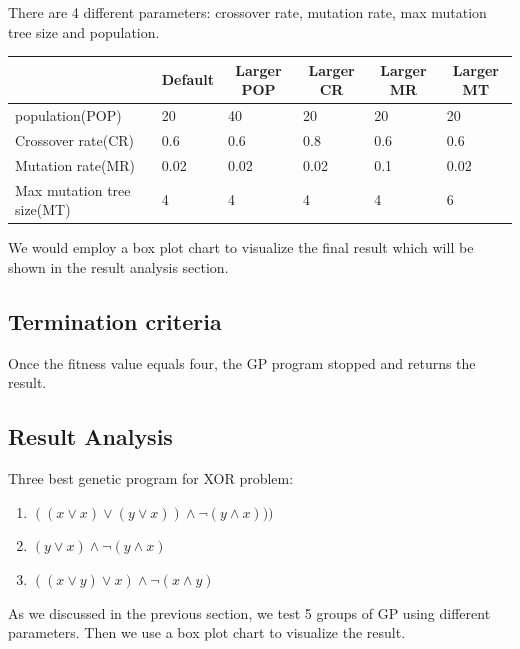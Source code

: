 \documentclass[11pt, a4paper, oneside, openright]{article}
\begin{document}
There  are 4 different parameters: crossover rate, mutation rate, max mutation tree size and population.
\begin{table}[H]
\centering
\begin{tabular}{|l|l|l|l|l|l|}
\hline
\multicolumn{1}{|c|}{\textbf{}} & \multicolumn{1}{c|}{\textbf{Default}} & \multicolumn{1}{c|}{\textbf{Larger POP}} &\multicolumn{1}{c|}{\textbf{Larger CR}} &\multicolumn{1}{c|}{\textbf{Larger MR}} &\multicolumn{1}{c|}{\textbf{Larger MT}}\\
\hline
population(POP)    &20     &40        &20    &20 &20                    \\
\hline
Crossover rate(CR)    &0.6  &0.6   &0.8   &0.6 &0.6                   \\
\hline
Mutation rate(MR)  &0.02  &0.02  &0.02  &0.1 &0.02              \\
\hline
Max mutation tree size(MT)    &4  &4 &4  &4 &6                     \\
\hline
\end{tabular}
\end{table}
We would employ a box plot chart to visualize the final result which will be shown in the result analysis section.

\subsection{Termination criteria}
Once the fitness value equals four, the GP program stopped and returns the result. 
\subsection{Result Analysis}
Three best genetic program for XOR problem:
\begin{enumerate}
\item $((x \vee x) \vee (y \vee x)) \wedge  \lnot(y \wedge x)))$
\item $(y \vee x) \wedge \lnot(y \wedge x)$
\item $((x \vee y) \vee x)  \wedge \lnot(x \wedge y)$
\end{enumerate}

As we discussed in the previous section,  we  test 5 groups of GP using different parameters. Then we use a box plot  chart to visualize the result.
\end{document}
